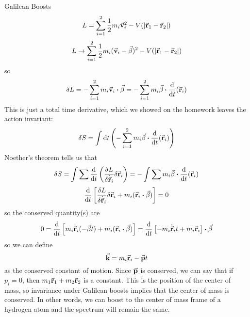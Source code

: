 \documentclass[a4paper,twoside,master.tex]{subfiles}
\begin{document}
\begin{note}{Galilean Boosts}
    \begin{equation}
        L = \sum_{i=1}^{2} \frac{1}{2} m_i \va{v}_i^2 - V(\abs{\va{r}_1 - \va{r}_2})
    \end{equation}
    \begin{equation}
        L \to \sum_{i=1}^{2} \frac{1}{2} m_i(\va{v}_i - \va{\beta})^2 - V(\abs{\va{r}_1 - \va{r}_2})
    \end{equation}
    so
    \begin{equation}
        \delta L = - \sum_{i=1}^{2} m_i \va{v}_i \vdot \va{\beta} = - \sum_{i=1}^{2} m_i \va{\beta} \vdot \dv{t}(\va{r}_i)
    \end{equation}
    This is just a total time derivative, which we showed on the homework leaves the action invariant:
    \begin{equation}
        \delta S = \int \dd{t} \left(- \sum_{i=1}^{2} m_i \va{\beta} \vdot \dv{t}(\va{r}_i) \right)
    \end{equation}
    Noether's theorem tells us that
    \begin{equation}
        \delta S = \int \sum \dv{t}\left( \fdv{L}{\dot{\va{r}}_i} \delta \va{r}_i \right) = - \int \sum m_i \va{\beta} \vdot \dv{t}(\va{r}_i)
    \end{equation}
    \begin{equation}
        \dv{t}\left[ \fdv{L}{\dot{\va{r}}_i} \delta \va{r}_i + m_i(\va{r}_i \vdot \va{\beta}) \right] = 0
    \end{equation}
    so the conserved quantity(s) are
    \begin{equation}
        0 = \dv{t}\left[ m_i \dot{\va{r}}_i(- \va{\beta} t) + m_i(\va{r}_i \vdot \va{\beta}) \right] = \dv{t} \left[ -m_i \dot{\va{r}}_i t + m_i \va{r}_i \right] \vdot \va{\beta}
    \end{equation}
    so we can define
    \begin{equation}
        \va{k} = m_i \va{r}_i - \va{p} t
    \end{equation}
    as the conserved constant of motion. Since $ \va{p} $ is conserved, we can say that if $ p_i = 0 $, then $ m_1 \va{r}_1 + m_2 \va{r}_2 $ is a constant. This is the position of the center of mass, so invariance under Galilean boosts implies that the center of mass is conserved. In other words, we can boost to the center of mass frame of a hydrogen atom and the spectrum will remain the same.


\end{note}
\end{document}
